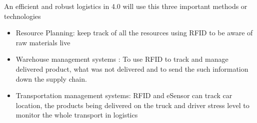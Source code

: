 \documentclass{article}
\begin{document}
\begin{normalsize}
	An efficient and robust logistics in 4.0 will use this three important methods or technologies
	 
  		\begin{itemize}
        
\item{Resource Planning: keep track of all the resources using RFID to be aware of raw materials live}
\item{Warehouse management systems : To use RFID to track and manage delivered product, what was not delivered and to send the such information down the supply chain. 
} 
\item{Transportation management systems: RFID and eSensor can track car location, the products being delivered on the truck and driver stress level to monitor the whole transport in logistics}

	\end{itemize}

	
\end{normalsize}
  
\end{document}
